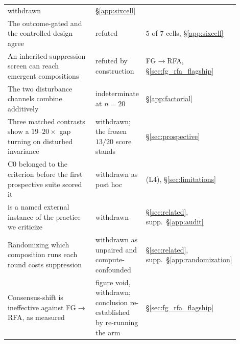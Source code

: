 \documentclass{article}
\begin{document}
\begin{table}[t]
\begin{tabular}{@{}p{0.42\linewidth}p{0.17\linewidth}p{0.31\linewidth}@{}}
\raggedright withdrawn & §\ref{app:sixcell} \\
The outcome-gated and the controlled design agree &
\raggedright refuted & $5$ of $7$ cells, §\ref{app:sixcell} \\
An inherited-suppression screen can reach emergent compositions &
\raggedright refuted by construction & FG$\to$RFA, §\ref{sec:fg_rfa_flagship} \\
The two disturbance channels combine additively &
\raggedright indeterminate at $n{=}20$ & §\ref{app:factorial} \\
Three matched contrasts show a $19$--$20\times$ gap turning on disturbed invariance &
\raggedright withdrawn; the frozen $13/20$ score stands & §\ref{sec:prospective} \\
C0 belonged to the criterion before the first prospective suite scored it &
\raggedright withdrawn as post hoc & (L4), §\ref{sec:limitations} \\
\citet{fenaux2025hammer} is a named external instance of the practice we criticize &
\raggedright withdrawn & §\ref{sec:related}, supp.\ §\ref{app:audit} \\
Randomizing which composition runs each round costs suppression &
\raggedright withdrawn as unpaired and compute-confounded & §\ref{sec:related}, supp.\ §\ref{app:randomization} \\
Consensus-shift is ineffective against FG$\to$RFA, as measured &
\raggedright figure void, withdrawn; conclusion re-established by re-running the arm & §\ref{sec:fg_rfa_flagship} \\
\bottomrule
\end{tabular}
\end{table}
\end{document}

